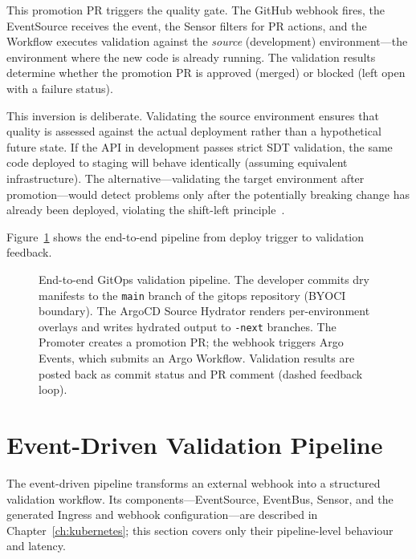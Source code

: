 This promotion PR triggers the quality gate. The GitHub webhook fires, the EventSource receives the event, the Sensor filters for PR actions, and the Workflow executes validation against the \textit{source} (development) environment---the environment where the new code is already running. The validation results determine whether the promotion PR is approved (merged) or blocked (left open with a failure status).

This inversion is deliberate. Validating the source environment ensures that quality is assessed against the actual deployment rather than a hypothetical future state. If the API in development passes strict SDT validation, the same code deployed to staging will behave identically (assuming equivalent infrastructure). The alternative---validating the target environment after promotion---would detect problems only after the potentially breaking change has already been deployed, violating the shift-left principle~\cite{shift-left}.

Figure~\ref{fig:gitops-pipeline} shows the end-to-end pipeline from deploy trigger to validation feedback.

\begin{figure}[htbp]
\centering
\resizebox{\textwidth}{!}{%
%
}
\caption{End-to-end GitOps validation pipeline. The developer commits dry manifests to the \texttt{main} branch of the gitops repository (BYOCI boundary). The ArgoCD Source Hydrator renders per-environment overlays and writes hydrated output to \texttt{-next} branches. The Promoter creates a promotion PR; the webhook triggers Argo Events, which submits an Argo Workflow. Validation results are posted back as commit status and PR comment (dashed feedback loop).}
\label{fig:gitops-pipeline}
\end{figure}

\section{Event-Driven Validation Pipeline}
\label{sec:event-pipeline-detail}

The event-driven pipeline transforms an external webhook into a structured validation workflow. Its components---EventSource, EventBus, Sensor, and the generated Ingress and webhook configuration---are described in Chapter~\ref{ch:kubernetes}; this section covers only their pipeline-level behaviour and latency.


